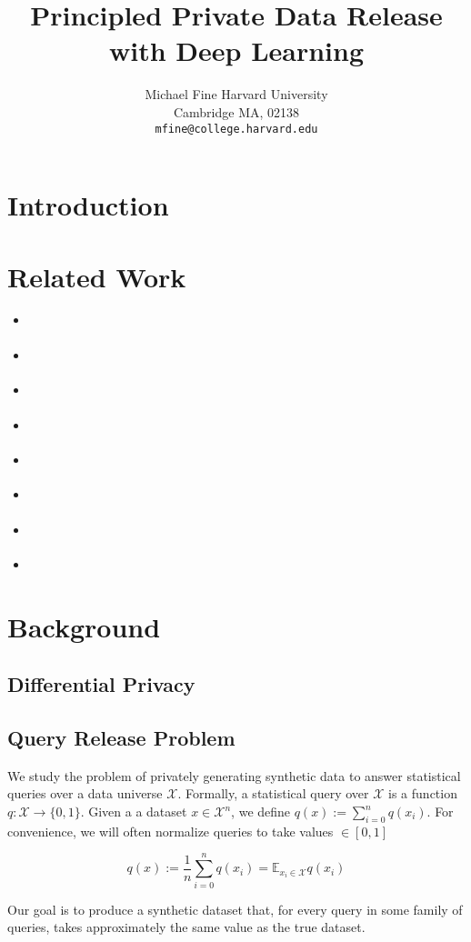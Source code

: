 \documentclass[]{article}
\author{%
  Michael Fine
  Harvard University\\
  Cambridge MA, 02138 \\
  \texttt{mfine@college.harvard.edu} 
}
\title{Principled Private Data Release with Deep Learning}
\newcommand{\X}{\mathcal{X}}
\newcommand{\B}{\{0,1\}}
\newcommand{\E}{\mathbb{E}}
\theoremstyle{definition}
\begin{document}
\maketitle

\section{Introduction}

\section{Related Work}
\begin{itemize}
    \item \cite{JY19}
    \item \cite{GLL+17}
    \item \cite{NRVW19}
    \item \cite{AGH18}
    \item \cite{NRW18}
    \item \cite{GAH+14}
    \item \cite{HLM12}
    \item \cite{GXC+18}
\end{itemize}
\section{Background}
\subsection{Differential Privacy}
\subsection{Query Release Problem}

We study the problem of privately generating synthetic data to answer statistical queries over a data universe $\X$. Formally, a statistical query over $\X$ is a function $q: \X \to \B$. Given a a dataset $x \in \X^n$, we define $q(x) := \sum_{i=0}^n q(x_i)$. For convenience, we will often normalize queries to take values $\in [0,1]$

\begin{equation}
    q(x) := \frac{1}{n}\sum_{i=0}^n q(x_i) = \E_{x_i \in \X} q(x_i)
\end{equation}

Our goal is to produce a synthetic dataset that, for every query in some family of queries, takes approximately the same value as the true dataset.
\end{document}
